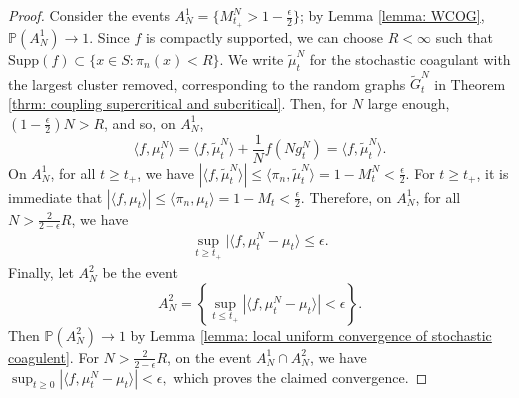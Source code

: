 \documentclass[11pt, notitlepage]{article}
\begin{document}
\begin{proof}
Consider the events $
        A^1_N=\{M^N_{t_+}>1-\frac{\epsilon}{2} \}$; by Lemma \ref{lemma: WCOG}, $\mathbb{P}(A^1_N)\rightarrow 1$. Since $f$ is compactly supported, we can choose $R<\infty$ such that $\text{Supp}(f)\subset \{x\in S: \pi_n(x)<R\}$. We write $\widetilde{\mu}^N_t$ for the stochastic coagulant with the largest cluster removed, corresponding to the random graphs $\widetilde{G}^N_t$ in Theorem \ref{thrm: coupling supercritical and subcritical}. Then, for $N$ large enough, $(1-\frac{\epsilon}{2})N>R$, and so, on $A^1_N$, \begin{equation}
    \langle f,\mu^N_t\rangle = \langle f,\widetilde{\mu}^N_t\rangle+\frac{1}{N}f(Ng^N_t) =  \langle f,\widetilde{\mu}^N_t\rangle.
\end{equation}
On $A^1_N$, for all $t\ge t_+$, we have $|\langle f, \widetilde{\mu}^N_t\rangle | \le \langle \pi_n, \widetilde{\mu}^N_t\rangle = 1-M^N_t<\frac{\epsilon}{2}.$
For $t\geq t_+$, it is immediate that $|\langle f, \mu_t\rangle| \leq \langle \pi_n, \mu_t\rangle = 1-M_t <\frac{\epsilon}{2}.$
Therefore, on $A^1_N$, for all $N > \frac{2}{2-\epsilon}R$, we have \begin{equation} \begin{split}
    \sup_{t\ge t_+} |\langle f, \mu^N_t-\mu_t\rangle \le \epsilon.   \end{split}
\end{equation} Finally, let $A^2_N$ be the event \begin{equation}
    A^2_N=\left\{\sup_{t\leq t_+} |\langle f, \mu^N_t-\mu_t\rangle |<\epsilon\right\}.
\end{equation} Then $\mathbb{P}(A^2_N)\rightarrow 1$ by Lemma \ref{lemma: local uniform convergence of stochastic coagulent}. For $N > \frac{2}{2-\epsilon}R$, on the event $A^1_N\cap A^2_N$, we have $\sup_{t\geq 0} |\langle f, \mu^N_t-\mu_t\rangle |<\epsilon,$ which proves the claimed convergence.
\fi
\end{proof}
\end{document}
